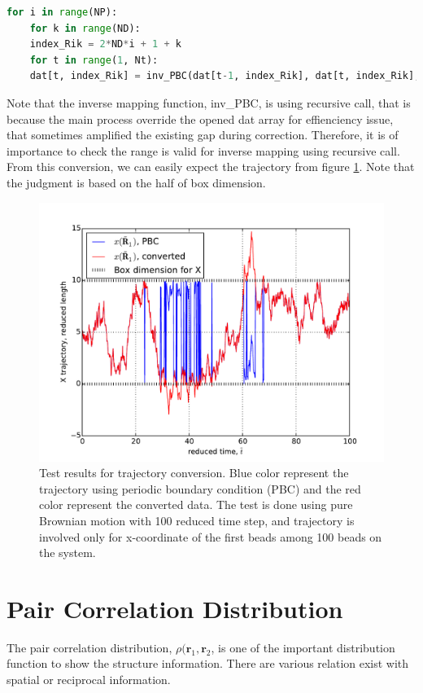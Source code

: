 \message{ !name(brief_Brownian_dynamics.tex)}\documentclass[10pt, a4paper]{report}
\begin{document}
\begin{appendices}
\begin{lstlisting}[language=Python, frame=single]
    for i in range(NP):
    for k in range(ND):
    index_Rik = 2*ND*i + 1 + k
    for t in range(1, Nt):
    dat[t, index_Rik] = inv_PBC(dat[t-1, index_Rik], dat[t, index_Rik], LB)
  \end{lstlisting}
  Note that the inverse mapping function, inv{\_}PBC, is using recursive call, that is because the main process override the opened dat array for effienciency issue, that sometimes amplified the existing gap during correction. Therefore, it is of importance to check the range is valid for inverse mapping using recursive call.
  From this conversion, we can easily expect the trajectory from figure \ref{fig:traj_conv}. Note that the judgment is based on the half of box dimension. 
  \begin{figure}
    \centering
    \includegraphics[width=\textwidth]{figures/converting_trajectory.pdf}
    \caption{Test results for trajectory conversion. Blue color represent the trajectory using periodic boundary condition (PBC) and the red color represent the converted data. The test is done using pure Brownian motion with 100 reduced time step, and trajectory is involved only for x-coordinate of the first beads among 100 beads on the system.}
    \label{fig:traj_conv}
  \end{figure}

  \section{Pair Correlation Distribution}
  The pair correlation distribution, $\rho(\mathbf{r}_1, \mathbf{r}_2$, is one of the important distribution function to show the structure information. There are various relation exist with spatial or reciprocal information.

\end{appendices}
\end{document}

